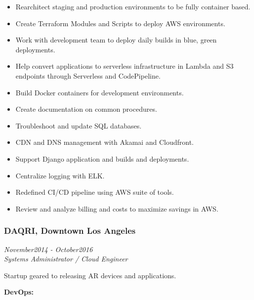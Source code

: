 \documentclass[]{article}
\providecommand{\tightlist}{%
  \setlength{\itemsep}{0pt}\setlength{\parskip}{0pt}}
\begin{document}
\begin{itemize}
\tightlist
\item
  Rearchitect staging and production environments to be fully container
  based.
\item
  Create Terraform Modules and Scripts to deploy AWS environments.
\item
  Work with development team to deploy daily builds in blue, green
  deployments.
\item
  Help convert applications to serverless infrastructure in Lambda and
  S3 endpoints through Serverless and CodePipeline.
\item
  Build Docker containers for development environments.
\item
  Create documentation on common procedures.
\item
  Troubleshoot and update SQL databases.
\item
  CDN and DNS management with Akamai and Cloudfront.
\item
  Support Django application and builds and deployments.
\item
  Centralize logging with ELK.
\item
  Redefined CI/CD pipeline using AWS suite of tools.
\item
  Review and analyze billing and costs to maximize savings in AWS.
\end{itemize}

\hypertarget{daqri-downtown-los-angeles}{%
\subsubsection{DAQRI, Downtown Los
Angeles}\label{daqri-downtown-los-angeles}}

\emph{November2014 - October2016}\\
\emph{Systems Administrator / Cloud Engineer}

Startup geared to releasing AR devices and applications.

\textbf{DevOps:}
\end{document}
